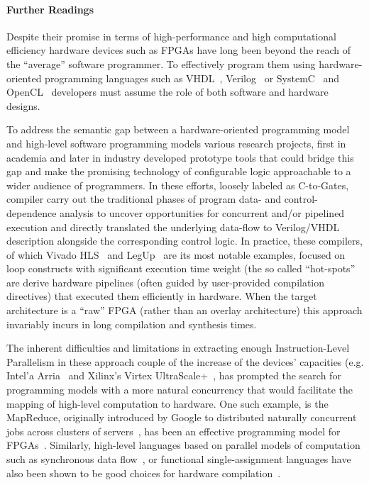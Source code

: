 \paragraph{Further Readings}
Despite their promise in terms of high-performance and high computational efficiency  hardware devices such as FPGAs have long been beyond the reach of the ``average'' software programmer. To effectively program them using hardware-oriented programming languages such as  VHDL~\cite{VHDLBook}, Verilog~\cite{VerilogBook} or SystemC~\cite{SystemC:ISSS01} and OpenCL~\cite{OpenCL} developers must assume the role of both software and hardware designs. 

To address the semantic gap between a hardware-oriented programming model and high-level software programming models various research projects, first in academia and later in industry developed prototype tools that could bridge this gap and make the promising technology of  configurable logic approachable to a wider audience of programmers.  In these efforts, loosely labeled as C-to-Gates, compiler carry out the traditional phases of program data- and control-dependence analysis to uncover opportunities for concurrent and/or pipelined execution and directly translated the underlying data-flow to Verilog/VHDL description alongside the corresponding control logic.   In practice, these compilers, of which Vivado HLS~\cite{Vivado} and LegUp~\cite{LegUp} are its most notable examples, focused on loop constructs with significant execution time weight (the so called ``hot-spots'' are derive hardware pipelines (often guided by user-provided compilation directives) that executed them efficiently in hardware. When the target architecture is a ``raw'' FPGA (rather than an overlay architecture) this approach invariably incurs in long compilation and synthesis times.

The inherent difficulties and limitations in extracting enough Instruction-Level Parallelism in these approach couple of the increase of the devices' capacities (e.g. Intel'a Arria~\cite{Arria} and Xilinx's Virtex UltraScale+~\cite{UltraScale}, has prompted the search for programming models with a more natural concurrency that would facilitate the mapping of high-level computation to hardware. One such example, is the MapReduce\cite{Dean:CACM08}, originally introduced by Google to distributed naturally concurrent  jobs across clusters of servers~\cite{Dean:CACM08}, has been an effective programming model for FPGAs~\cite{Yeung:FCCM08}. Similarly, high-level languages based on parallel models of computation such as synchronous data flow~\cite{Lee:ProcIEEE87}, or functional single-assignment languages have  also been shown to be good choices for hardware  compilation~\cite{Hormati:CASES08,Hagiescu:DAC09,SAC:IJS02}.


